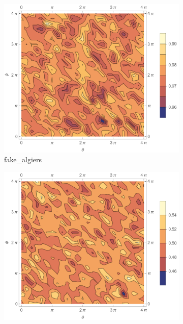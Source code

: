 \documentclass[12pt]{extarticle}
\begin{document}
\begin{figure}[htbp]
    \centering
    \captionsetup[subfigure]{labelformat=empty}
    \begin{subfigure}[b]{0.45\textwidth}
        \centering
        \includegraphics[width=\textwidth]{images/homework3_q1_algiers_contour.png}
        \caption{fake\_algiers}
    \end{subfigure}
    \hfill
    \begin{subfigure}[b]{0.45\textwidth}
        \centering
        \includegraphics[width=\textwidth]{images/homework3_q1_kyoto_contour.png}

\end{subfigure}
\end{figure}
\end{document}
